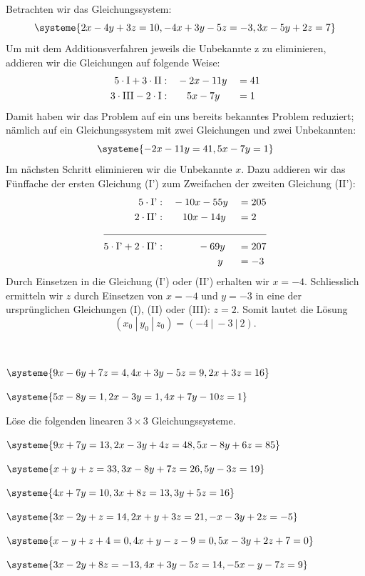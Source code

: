 \documentclass[11pt,oneside]{article}
\begin{document}
	\begin{beispiel}
		Betrachten wir das Gleichungssystem: \[\systeme{2x-4y+3z=10,-4x+3y-5z=-3,3x-5y+2z=7}\]
		Um mit dem Additionsverfahren jeweils die Unbekannte z zu eliminieren, addieren wir die Gleichungen auf folgende Weise:
		\begin{alignat*}{2}
			5\cdot\text{I}+3\cdot\text{II}:&\quad -2x-11y&&=41\\
			3\cdot\text{III}-2\cdot\text{I}:&\qquad 5x-7y&&=1
		\end{alignat*}
		Damit haben wir das Problem auf ein uns bereits bekanntes Problem reduziert; nämlich auf ein Gleichungssystem mit zwei Gleichungen und zwei Unbekannten: \[\systeme{-2x-11y=41,5x-7y=1}\]
		Im nächsten Schritt eliminieren wir die Unbekannte $x$. Dazu addieren wir das Fünffache der ersten Gleichung (I’) zum Zweifachen der zweiten Gleichung (II’):
		\begin{alignat*}{2}
			5\*\text{I'}:&\quad -10x-55y&&=205\\
			2\*\text{II'}:&\quad \phantom{30}10x-14y&&=2\\
			\cline{1-4}
			5\*\text{I'}+2\*\text{II'}:&\quad\phantom{30000}-69y&&=207\\
			&\quad\phantom{300000000} y&&=-3
		\end{alignat*}
		Durch Einsetzen in die Gleichung (I') oder (II’) erhalten wir $x=-4$. Schliesslich ermitteln wir $z$ durch Einsetzen von $x=-4$ und $y=-3$ in eine der ursprünglichen Gleichungen (I), (II) oder (III): $z=2$. Somit lautet die Lösung \[(x_0\:|\: y_0\:|\: z_0)=(-4\:|\:-3\:|\:2).\]
	\end{beispiel}
	\begin{beispiel}\ \\
		\begin{enumcols}[2]
			\item $\displaystyle\systeme{9x-6y+7z=4,4x+3y-5z=9,2x+3z=16}$
			\item $\displaystyle\systeme{5x-8y=1,2x-3y=1,4x+7y-10z=1}$
		\end{enumcols}
	\end{beispiel}
	\begin{aufgabe}
		Löse die folgenden linearen $3\times3$ Gleichungssysteme.
		\begin{enumcols}[3]
			\item $\displaystyle\systeme{9x+7y=13,2x-3y+4z=48,5x-8y+6z=85}$
			\item $\displaystyle\systeme{x+y+z=33,3x-8y+7z=26,5y-3z=19}$
			\item $\displaystyle\systeme{4x+7y=10,3x+8z=13,3y+5z=16}$
			\item $\displaystyle\systeme{3x-2y+z=14,2x+y+3z=21,-x-3y+2z=-5}$
			\item $\displaystyle\systeme{x-y+z+4=0,4x+y-z-9=0,5x-3y+2z+7=0}$
			\item $\displaystyle\systeme{3x-2y+8z=-13,4x+3y-5z=14,-5x-y-7z=9}$
		\end{enumcols}
	\end{aufgabe}
\end{document}
